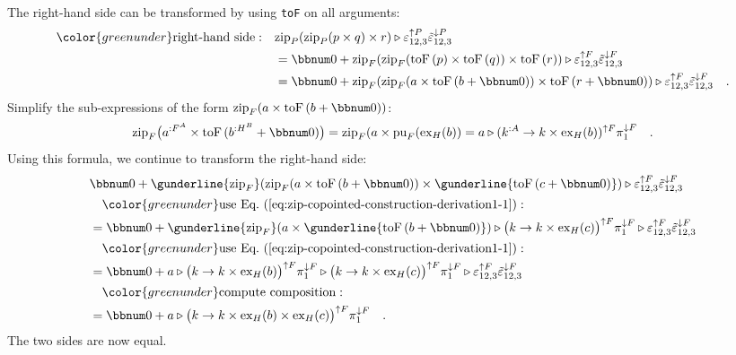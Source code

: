 The right-hand side can be transformed by using \lstinline!toF! on
all arguments:
\begin{align*}
{\color{greenunder}\text{right-hand side}:}\quad & \text{zip}_{P}(\text{zip}_{P}(p\times q)\times r)\triangleright\varepsilon_{12,3}^{\uparrow P}\tilde{\varepsilon}_{12,3}^{\downarrow P}\\
 & =\bbnum 0+\text{zip}_{F}(\text{zip}_{F}(\text{toF}\left(p\right)\times\text{toF}\left(q\right))\times\text{toF}\left(r\right))\triangleright\varepsilon_{12,3}^{\uparrow F}\tilde{\varepsilon}_{12,3}^{\downarrow F}\\
 & =\bbnum 0+\text{zip}_{F}(\text{zip}_{F}(a\times\text{toF}\left(b+\bbnum 0\right))\times\text{toF}\left(r+\bbnum 0\right))\triangleright\varepsilon_{12,3}^{\uparrow F}\tilde{\varepsilon}_{12,3}^{\downarrow F}\quad.
\end{align*}
Simplify the sub-expressions of the form $\text{zip}_{F}(a\times\text{toF}\left(b+\bbnum 0\right))$:
\begin{equation}
\text{zip}_{F}\big(a^{:F^{A}}\times\text{toF}\,(b^{:H^{B}}+\bbnum 0)\big)=\text{zip}_{F}(a\times\text{pu}_{F}(\text{ex}_{H}(b))=a\triangleright(k^{:A}\rightarrow k\times\text{ex}_{H}(b))^{\uparrow F}\pi_{1}^{\downarrow F}\quad.\label{eq:zip-copointed-construction-derivation1-1}
\end{equation}
Using this formula, we continue to transform the right-hand side:
\begin{align*}
 & \bbnum 0+\gunderline{\text{zip}_{F}}(\text{zip}_{F}(a\times\text{toF}\left(b+\bbnum 0\right))\times\gunderline{\text{toF}\left(c+\bbnum 0\right)})\triangleright\varepsilon_{12,3}^{\uparrow F}\tilde{\varepsilon}_{12,3}^{\downarrow F}\\
 & \quad{\color{greenunder}\text{use Eq.~(\ref{eq:zip-copointed-construction-derivation1-1})}:}\quad\\
 & =\bbnum 0+\gunderline{\text{zip}_{F}}(a\times\gunderline{\text{toF}\left(b+\bbnum 0\right)})\triangleright\big(k\rightarrow k\times\text{ex}_{H}(c)\big)^{\uparrow F}\pi_{1}^{\downarrow F}\triangleright\varepsilon_{12,3}^{\uparrow F}\tilde{\varepsilon}_{12,3}^{\downarrow F}\\
 & \quad{\color{greenunder}\text{use Eq.~(\ref{eq:zip-copointed-construction-derivation1-1})}:}\quad\\
 & =\bbnum 0+a\triangleright\big(k\rightarrow k\times\text{ex}_{H}(b)\big)^{\uparrow F}\pi_{1}^{\downarrow F}\triangleright\big(k\rightarrow k\times\text{ex}_{H}(c)\big)^{\uparrow F}\pi_{1}^{\downarrow F}\triangleright\varepsilon_{12,3}^{\uparrow F}\tilde{\varepsilon}_{12,3}^{\downarrow F}\\
 & \quad{\color{greenunder}\text{compute composition}:}\quad\\
 & =\bbnum 0+a\triangleright\big(k\rightarrow k\times\text{ex}_{H}(b)\times\text{ex}_{H}(c)\big)^{\uparrow F}\pi_{1}^{\downarrow F}\quad.
\end{align*}
The two sides are now equal. 

